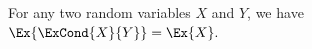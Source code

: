 \begin{lemma}%
    For any two random variables $X$ and $Y$, we have
    \begin{math}
        \Ex{ \bigl. \ExCond{X}{ Y} } = \Ex{ \bigl. X}.
    \end{math}
\end{lemma}
